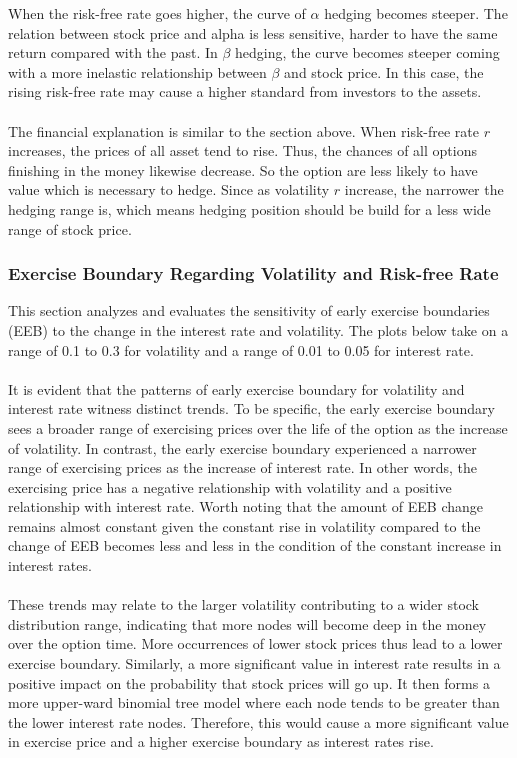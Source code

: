 \documentclass[12pt]{article}
\begin{document}
When the risk-free rate goes higher, the curve of $\alpha$ hedging becomes steeper. The relation between stock price and alpha is less sensitive, harder to have the same return 
compared with the past. In $\beta$ hedging, the curve becomes steeper coming with a more inelastic relationship between $\beta$ and stock price. In this case, the rising risk-free 
rate may cause a higher standard from investors to the assets.
\\\\
The financial explanation is similar to the section above. When risk-free rate $r$ increases, the prices of all asset tend to rise. Thus, the chances 
of all options finishing in the money likewise decrease. So the option are less likely to have value which is necessary to hedge. Since as volatility $r$ increase,
the narrower the hedging range is, which means hedging position should be build for a less wide range of stock price.  

\subsubsection{Exercise Boundary Regarding Volatility and Risk-free Rate}
This section analyzes and evaluates the sensitivity of early exercise boundaries (EEB) to the change in the interest rate and volatility. The plots below take on a range of 0.1 
to 0.3 for volatility and a range of 0.01 to 0.05 for interest rate. \\\\
It is evident that the patterns of early exercise boundary for volatility and interest rate witness distinct trends. To be specific, the early exercise boundary sees a broader 
range of exercising prices over the life of the option as the increase of volatility. In contrast, the early exercise boundary experienced a narrower range of exercising prices as 
the increase of interest rate. In other words, the exercising price has a negative relationship with volatility and a positive relationship with interest rate. Worth noting that the 
amount of EEB change remains almost constant given the constant rise in volatility compared to the change of EEB becomes less and less in the condition of the constant increase in interest rates.
\\\\
These trends may relate to the larger volatility contributing to a wider stock distribution range, indicating that more nodes will become deep in the money over the option time. More occurrences of 
lower stock prices thus lead to a lower exercise boundary. Similarly, a more significant value in interest rate results in a positive impact on the probability that stock prices will go up. It then 
forms a more upper-ward binomial tree model where each node tends to be greater than the lower interest rate nodes. Therefore, this would cause a more significant value in exercise price and a higher 
exercise boundary as interest rates rise.
\end{document}
